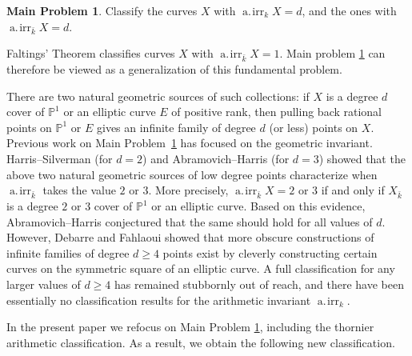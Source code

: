 \documentclass[11pt]{amsart}
\newcommand{\PP}{\mathbb{P}}
\newcommand{\pp}{\mathbb{P}}
\newcommand{\kbar}{{\bar{k}}}
\newcommand{\airr}{\operatorname{a.\!irr}}
\theoremstyle{definition}
\newtheorem{mproblem}[theorem]{Main Problem}
\theoremstyle{remark}
\begin{document}
\begin{mproblem}\label{main-prob}
Classify the curves $X$ with $\airr_k X = d$, and the ones with \(\airr_{\kbar}X = d\).
\end{mproblem}

Faltings' Theorem classifies curves \(X\) with \(\airr_{\kbar}X =1\).  Main problem \ref{main-prob} can therefore be viewed as a generalization of this fundamental problem.


There are two natural geometric sources of such collections: if $X$ is a degree $d$ cover of $\PP^1$ or an elliptic curve $E$ of positive rank, then pulling back rational points on $\PP^1$ or $E$ gives an infinite family of degree $d$ (or less) points on $X$.
Previous work on Main Problem~\ref{main-prob} has focused on the geometric invariant.
Harris--Silverman (for \(d=2\)) and Abramovich--Harris (for \(d=3\)) showed that the above two natural geometric sources of low degree points characterize when \(\airr_{\kbar}\) takes the value \(2\) or \(3\). More precisely, \(\airr_{\bar{k}}X = 2\) or \(3\) if and only if \(X_\kbar\) is a degree \(2\) or \(3\) cover of \(\pp^1\) or an elliptic curve.  Based on this evidence, Abramovich--Harris conjectured that the same should hold for all values of \(d\).  However, Debarre and Fahlaoui \cite{Debarre-Fahlaoui1993} showed that more obscure constructions of infinite families of degree \(d \geqslant 4\) points exist by cleverly constructing certain curves on the symmetric square of an elliptic curve.  A full classification for any larger values of \(d \geqslant 4\) has remained stubbornly out of reach, and there have been essentially no classification results for the arithmetic invariant \(\airr_k\).

In the present paper we refocus on Main Problem \ref{main-prob}, including the thornier arithmetic classification.  As a result, we obtain the following new classification.
\end{document}
